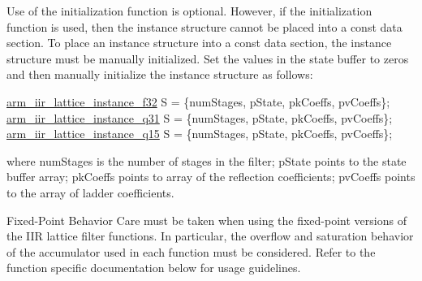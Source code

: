 \begin{DoxyParagraph}{}
Use of the initialization function is optional. However, if the initialization function is used, then the instance structure cannot be placed into a const data section. To place an instance structure into a const data section, the instance structure must be manually initialized. Set the values in the state buffer to zeros and then manually initialize the instance structure as follows\-: 
\begin{DoxyPre}   
\hyperlink{structarm__iir__lattice__instance__f32}{arm\_iir\_lattice\_instance\_f32} S = \{numStages, pState, pkCoeffs, pvCoeffs\};   
\hyperlink{structarm__iir__lattice__instance__q31}{arm\_iir\_lattice\_instance\_q31} S = \{numStages, pState, pkCoeffs, pvCoeffs\};   
\hyperlink{structarm__iir__lattice__instance__q15}{arm\_iir\_lattice\_instance\_q15} S = \{numStages, pState, pkCoeffs, pvCoeffs\};   
 \end{DoxyPre}
 
\end{DoxyParagraph}
\begin{DoxyParagraph}{}
where {\ttfamily num\-Stages} is the number of stages in the filter; {\ttfamily p\-State} points to the state buffer array; {\ttfamily pk\-Coeffs} points to array of the reflection coefficients; {\ttfamily pv\-Coeffs} points to the array of ladder coefficients. 
\end{DoxyParagraph}
\begin{DoxyParagraph}{Fixed-\/\-Point Behavior }
Care must be taken when using the fixed-\/point versions of the I\-I\-R lattice filter functions. In particular, the overflow and saturation behavior of the accumulator used in each function must be considered. Refer to the function specific documentation below for usage guidelines. 
\end{DoxyParagraph}


